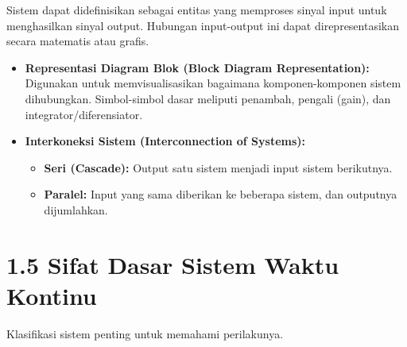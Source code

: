 \documentclass[
  letterpaper,
  DIV=11,
  numbers=noendperiod]{scrreprt}
\providecommand{\tightlist}{%
  \setlength{\itemsep}{0pt}\setlength{\parskip}{0pt}}\usepackage{longtable,booktabs,array}
\begin{document}
Sistem dapat didefinisikan sebagai entitas yang memproses sinyal input
untuk menghasilkan sinyal output. Hubungan input-output ini dapat
direpresentasikan secara matematis atau grafis.

\begin{itemize}
\tightlist
\item
  \textbf{Representasi Diagram Blok (Block Diagram Representation):}
  Digunakan untuk memvisualisasikan bagaimana komponen-komponen sistem
  dihubungkan. Simbol-simbol dasar meliputi penambah, pengali (gain),
  dan integrator/diferensiator.
\item
  \textbf{Interkoneksi Sistem (Interconnection of Systems):}

  \begin{itemize}
  \tightlist
  \item
    \textbf{Seri (Cascade):} Output satu sistem menjadi input sistem
    berikutnya.
  \item
    \textbf{Paralel:} Input yang sama diberikan ke beberapa sistem, dan
    outputnya dijumlahkan.
  \end{itemize}
\end{itemize}

\section{1.5 Sifat Dasar Sistem Waktu
Kontinu}\label{sifat-dasar-sistem-waktu-kontinu}

Klasifikasi sistem penting untuk memahami perilakunya.
\end{document}

